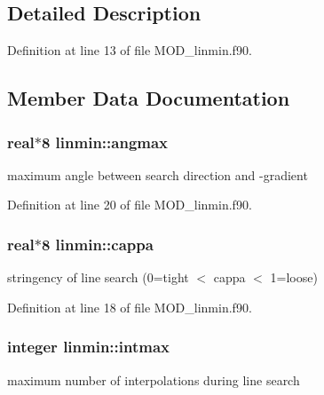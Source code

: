\subsection{Detailed Description}


Definition at line 13 of file M\-O\-D\-\_\-linmin.\-f90.



\subsection{Member Data Documentation}
\hypertarget{classlinmin_ad8ca531ffe4ac8f1c9356ab531b613f8}{
\subsubsection[{angmax}]{\setlength{\rightskip}{0pt plus 5cm}real$\ast$8 linmin\-::angmax}}\label{classlinmin_ad8ca531ffe4ac8f1c9356ab531b613f8}


maximum angle between search direction and -\/gradient 



Definition at line 20 of file M\-O\-D\-\_\-linmin.\-f90.

\hypertarget{classlinmin_a770737c749f078ddf7db6f68058c01d3}{
\subsubsection[{cappa}]{\setlength{\rightskip}{0pt plus 5cm}real$\ast$8 linmin\-::cappa}}\label{classlinmin_a770737c749f078ddf7db6f68058c01d3}


stringency of line search (0=tight $<$ cappa $<$ 1=loose) 



Definition at line 18 of file M\-O\-D\-\_\-linmin.\-f90.

\hypertarget{classlinmin_a2acad4a46724281eebc133a23ba83ac0}{
\subsubsection[{intmax}]{\setlength{\rightskip}{0pt plus 5cm}integer linmin\-::intmax}}\label{classlinmin_a2acad4a46724281eebc133a23ba83ac0}


maximum number of interpolations during line search 



